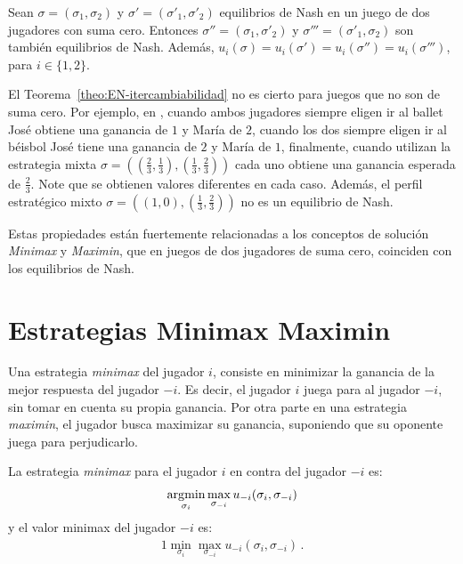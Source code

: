 \begin{theorem}
\label{theo:EN-itercambiabilidad}
Sean $\sigma = (\sigma_1, \sigma_2)$ y $\sigma' = (\sigma'_1, \sigma'_2)$ equilibrios de Nash en un juego de dos jugadores con suma cero. Entonces $\sigma'' = (\sigma_1, \sigma'_2)$ y $\sigma''' = (\sigma'_1, \sigma_2)$ son también equilibrios de Nash. Además, $u_i(\sigma) = u_i(\sigma') = u_i(\sigma'') = u_i(\sigma''')$, para $i \in \{1, 2\}$.
\end{theorem}

El Teorema~\ref{theo:EN-itercambiabilidad} no es cierto para juegos que no son de suma cero. Por ejemplo, en , cuando ambos jugadores siempre eligen ir al ballet José obtiene una ganancia de $1$ y María de $2$, cuando los dos siempre eligen ir al béisbol José tiene una ganancia de $2$ y María de $1$, finalmente, cuando utilizan la estrategia mixta $\sigma = \left(\left(\frac{2}{3}, \frac{1}{3}\right), \left(\frac{1}{3}, \frac{2}{3}\right)\right)$ cada uno obtiene una ganancia esperada de $\frac{2}{3}$. Note que se obtienen valores diferentes en cada caso. Además, el perfil estratégico mixto $\sigma = \left((1, 0), \left(\frac{1}{3}, \frac{2}{3}\right)\right)$ no es un equilibrio de Nash.

Estas propiedades están fuertemente relacionadas a los conceptos de solución \textit{Minimax} y \textit{Maximin}, que en juegos de dos jugadores de suma cero, coinciden con los equilibrios de Nash.

\section{Estrategias Minimax Maximin}

Una estrategia \textit{minimax} del jugador $i$, consiste en minimizar la ganancia de la mejor respuesta del jugador $-i$. Es decir, el jugador $i$ juega para  al jugador $-i$, sin tomar en cuenta su propia ganancia. Por otra parte en una estrategia \textit{maximin}, el jugador busca maximizar su ganancia, suponiendo que su oponente juega para perjudicarlo.

\begin{definition}
La estrategia \textit{minimax} para el jugador $i$ en contra del jugador $-i$ es:
\begin{alignat}{1}
\operatorname*{\arg\!\min}_{\sigma_i}{\max_{\sigma_{-i}}{u_{-i}(\sigma_i, \sigma_{-i})}}
\end{alignat}
y el valor minimax del jugador $-i$ es:
\begin{alignat}{1}
\min_{\sigma_i}{\max_{\sigma_{-i}}{u_{-i}(\sigma_i, \sigma_{-i})}} \,.
\end{alignat}
\end{definition}

